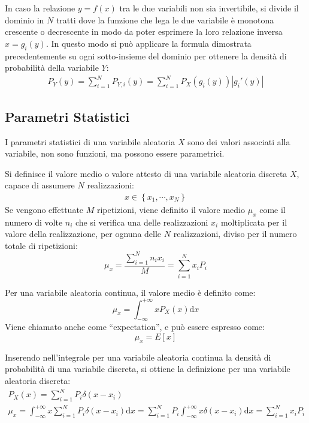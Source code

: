 \documentclass{article}
\newcommand{\df}{\mathrm{d}}
\numberwithin{equation}{subsection}
\begin{document}
In caso la relazione $y=f(x)$ tra le due variabili non sia invertibile, si divide il dominio in $N$ tratti dove la funzione che lega le due variabile è monotona crescente o 
decrescente in modo da poter esprimere la loro relazione inversa $x=g_i(y)$. In questo modo si può applicare la formula dimostrata precedentemente su ogni 
sotto-insieme del dominio per ottenere la densità di probabilità della variabile $Y$:
\begin{gather*}
    P_Y(y)=\displaystyle\sum_{i=1}^NP_{Y,i}(y)=\sum_{i=1}^NP_X(g_i(y))|g_i'(y)|
\end{gather*} 

\subsection{Parametri Statistici}
\label{sec:parametri-statistici}

I parametri statistici di una variabile aleatoria $X$ sono dei valori associati alla variabile, non sono funzioni, ma possono essere parametrici. 

Si definisce il valore medio o valore attesto di una variabile aleatoria discreta $X$, capace di assumere $N$ realizzazioni:
\begin{gather*}
    x\in\left\{x_1,\cdots,x_N\right\}
\end{gather*}
Se vengono effettuate $M$ ripetizioni, viene definito il valore medio $\mu_x$ come il numero di volte $n_i$ che si verifica una delle realizzazioni $x_i$ moltiplicata per 
il valore della realizzazione, per ognuna delle $N$ realizzazioni, diviso per il numero totale di ripetizioni:
\begin{equation}
    \mu_x=\displaystyle\frac{\displaystyle\sum_{i=1}^Nn_ix_i}{M}=\sum_{i=1}^Nx_iP_i
\end{equation}

Per una variabile aleatoria continua, il valore medio è definito come:
\begin{equation}
    \mu_x=\displaystyle\int_{-\infty}^{+\infty}xP_X(x)\df x
\end{equation}
Viene chiamato anche come ``expectation'', e può essere espresso come:
\begin{equation}
    \mu_x=E[x]
\end{equation}


Inserendo nell'integrale per una variabile aleatoria continua la densità di probabilità di una variabile discreta, si ottiene la definizione per una variabile aleatoria discreta:
\begin{gather*}
    P_X(x)=\displaystyle\sum_{i=1}^NP_i\delta(x-x_i)\\
    \mu_x=\displaystyle\int_{-\infty}^{+\infty}x\sum_{i=1}^NP_i\delta(x-x_i)\df x=\sum_{i=1}^NP_i\int_{-\infty}^{+\infty}x\delta(x-x_i)\df x=\sum_{i=1}^Nx_iP_i
\end{gather*}
\end{document}
